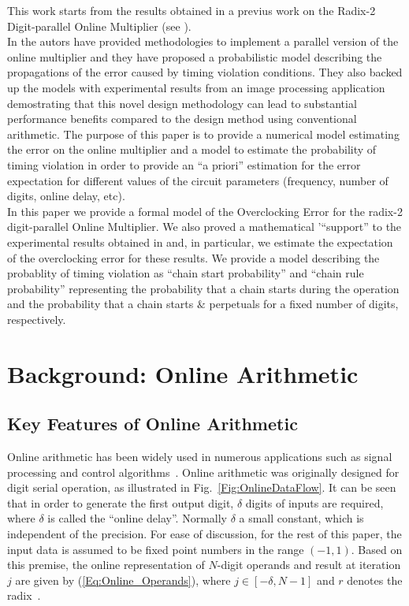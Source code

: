 \documentclass[journal]{IEEEtran}
\begin{document}
This work starts from the results obtained in a previus work on the Radix-2 Digit-parallel Online Multiplier (see \cite{onlinearith}).\\
 In \cite{onlinearith} the autors have provided methodologies to implement a parallel version of the online multiplier and they have proposed a probabilistic model describing the propagations of the error caused by timing violation conditions. They also backed up the models with experimental results from an image processing application demostrating that this novel design methodology can lead to substantial performance benefits compared to the design method using conventional arithmetic. The purpose of this paper is to provide a numerical model estimating the error on the online multiplier and a model to estimate the probability of timing violation in order to provide an ``a priori'' estimation for the error expectation for different values of the circuit parameters (frequency, number of digits, online delay, etc).  \\
In this paper we provide a formal model of the Overclocking Error for the radix-2 digit-parallel Online Multiplier. We also proved a mathematical '``support'' to the experimental results obtained in  \cite{onlinearith} and, in particular, we estimate the expectation of the overclocking error for these results. We provide a model describing the probablity of timing violation as ``chain start probability'' and ``chain rule probability'' representing the probability that a chain starts during the operation and the probability that a chain starts $\&$ perpetuals for a fixed number of digits, respectively.  \\














\section{Background: Online Arithmetic}\label{Sec:Background}
\subsection{Key Features of Online Arithmetic}

Online arithmetic has been widely used in numerous applications such as signal processing and control algorithms~\cite{Online_FPGADSP,Online_Control}. Online arithmetic was originally designed for digit serial operation, as illustrated in Fig.~\ref{Fig:OnlineDataFlow}. It can be seen that in order to generate the first output digit, $\delta$ digits of inputs are required, where $\delta$ is called the ``online delay''. Normally $\delta$ a small constant, which is independent of the precision. For ease of discussion, for the rest of this paper, the input data is assumed to be fixed point numbers in the range $(-1,1)$. Based on this premise, the online representation of $N$-digit operands and result at iteration $j$ are given by (\ref{Eq:Online_Operands}), where $j\in[-\delta,N-1]$ and $r$ denotes the radix~\cite{Ercegovac_Book}.
\end{document}
